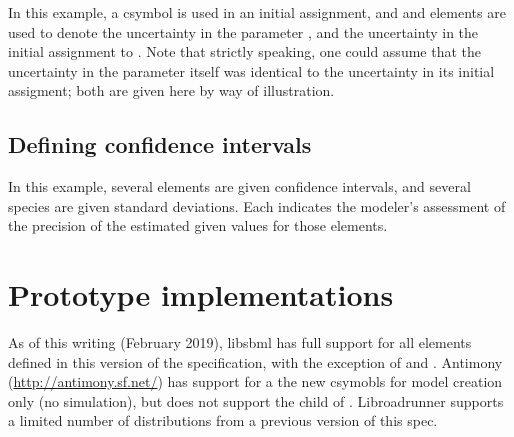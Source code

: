 \documentclass[draftspec]{sbmlpkgspec}
\newcommand{\Distribution}{\defRef{Distribution}{Distribution-class}}
\begin{document}
In this example, a  csymbol is used in an initial assignment, and  and  elements are used to denote the uncertainty in the parameter , and the uncertainty in the initial assignment to .  Note that strictly speaking, one could assume that the uncertainty in the parameter itself was identical to the uncertainty in its initial assigment; both are given here by way of illustration.



\subsection{Defining confidence intervals }

In this example, several \Parameter elements are given confidence intervals, and several species are given standard deviations.  Each indicates the modeler's assessment of the precision of the estimated given values for those elements.  







\section{Prototype implementations}

As of this writing (February 2019), libsbml has full support for all elements defined in this version of the specification, with the exception of  and .  Antimony (\url{http://antimony.sf.net/}) has support for a the new csymobls for model creation only (no simulation), but does not support the  child of \SBase.  Libroadrunner supports a limited number of distributions from a previous version of this spec.

\end{document}
